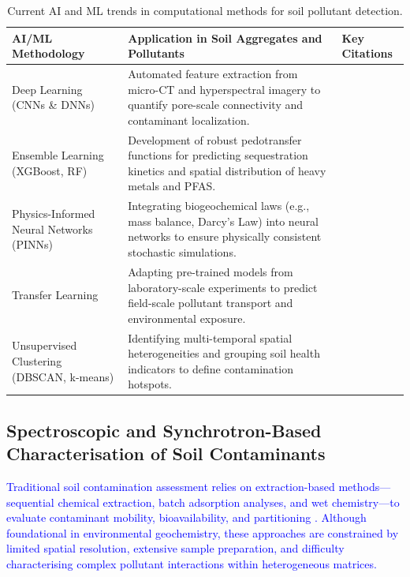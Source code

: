 \documentclass[environments,article,submit,pdftex,moreauthors]{Definitions/mdpi}
\begin{document}
\setlength{\LTcapwidth}{\textwidth}
\begin{table}[H]
\caption{Current AI and ML trends in computational methods for soil
    pollutant detection.\label{tab:AI_ML_Soil_Trends}}
\begin{tabularx}{\textwidth}{p{2.8cm} p{7.5cm} X}
\toprule
\textbf{AI/ML Methodology}
    & \textbf{Application in Soil Aggregates and Pollutants}
    & \textbf{Key Citations} \\
\midrule
Deep Learning (CNNs \& DNNs)
    & Automated feature extraction from micro-CT and hyperspectral imagery
      to quantify pore-scale connectivity and contaminant localization.
    & \cite{Demiral2026,Fan2025} \\[4pt]
Ensemble Learning (XGBoost, RF)
    & Development of robust pedotransfer functions for predicting
      sequestration kinetics and spatial distribution of heavy metals and
      PFAS.
    & \cite{app16115402} \\[4pt]
Physics-Informed Neural Networks (PINNs)
    & Integrating biogeochemical laws (e.g., mass balance, Darcy's Law)
      into neural networks to ensure physically consistent stochastic
      simulations.
    & \cite{KAMIL2024117276} \\[4pt]
Transfer Learning
    & Adapting pre-trained models from laboratory-scale experiments to
      predict field-scale pollutant transport and environmental exposure.
    & \cite{s25134209} \\[4pt]
Unsupervised Clustering (DBSCAN, k-means)
    & Identifying multi-temporal spatial heterogeneities and grouping soil
      health indicators to define contamination hotspots.
    & \cite{TavallaieNejad} \\
\bottomrule
\end{tabularx}
\end{table}

\subsection{Spectroscopic and Synchrotron-Based Characterisation of Soil
    Contaminants}\label{sec3.1}

\textcolor{blue}{Traditional soil contamination assessment relies on extraction-based methods---sequential chemical extraction, batch adsorption analyses, and wet chemistry---to evaluate contaminant mobility, bioavailability, and partitioning \cite{Sutherland2010}. Although foundational in environmental geochemistry, these approaches are constrained by limited spatial resolution, extensive sample preparation, and difficulty characterising complex pollutant interactions within heterogeneous matrices.}
\end{document}
